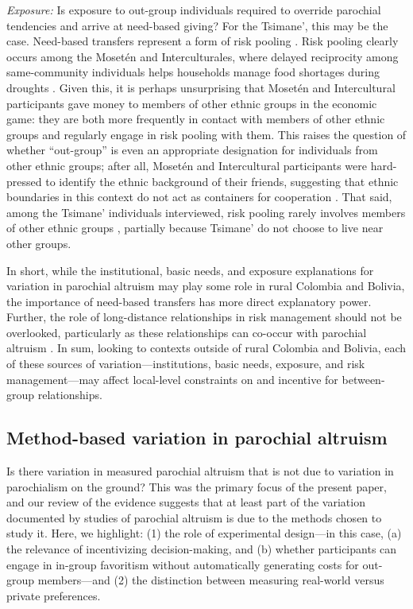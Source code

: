 \documentclass[bibauthoryear]{aa}
\begin{document}
\emph{Exposure:} Is exposure to out-group individuals required to override parochial tendencies and arrive at need-based giving? For the Tsimane', this may be the case. Need-based transfers represent a form of risk pooling \citep{cronk2019managing}. Risk pooling clearly occurs among the Moset\'en and Interculturales, where delayed reciprocity among same-community individuals helps households manage food shortages during droughts \citep{pisorjones2020}. Given this, it is perhaps unsurprising that Moset\'en and Intercultural participants gave money to members of other ethnic groups in the economic game: they are both more frequently in contact with members of other ethnic groups and regularly engage in risk pooling with them. This raises the question of whether ``out-group'' is even an appropriate designation for individuals from other ethnic groups; after all, Moset\'en and Intercultural participants were hard-pressed to identify the ethnic background of their friends, suggesting that ethnic boundaries in this context do not act as containers for cooperation  \citep[e.g.,][]{brewer1976ethnocentrism, moya2015different}. That said, among the Tsimane' individuals interviewed, risk pooling rarely involves members of other ethnic groups  \citep[see also][]{jaeggi2016reciprocal}, partially because Tsimane' do not choose to live near other groups.

In short, while the institutional, basic needs, and exposure explanations for variation in parochial altruism may play some role in rural Colombia and Bolivia, the importance of need-based transfers  has more direct explanatory power. Further, the role of long-distance relationships in risk management should not be overlooked, particularly as these relationships can co-occur with parochial altruism  \citep{bollig1993intra, brewer1976ethnocentrism, lathrap1973antiquity, bowles2004persistent}. In sum, looking to contexts outside of rural Colombia and Bolivia, each of these sources of variation---institutions, basic needs, exposure, and risk management---may affect local-level constraints on and incentive for between-group relationships.

\subsection{Method-based variation in parochial altruism}

Is there variation in measured parochial altruism that is not due to variation in parochialism on the ground? This was the primary focus of the present paper, and our review of the evidence suggests that at least part of the variation documented by studies of parochial altruism is due to the methods chosen to study it. Here, we highlight: (1) the role of experimental design---in this case, (a) the relevance of incentivizing decision-making, and (b) whether participants can engage in in-group favoritism without automatically generating costs for out-group members---and (2) the distinction between measuring real-world versus private preferences.
\end{document}
